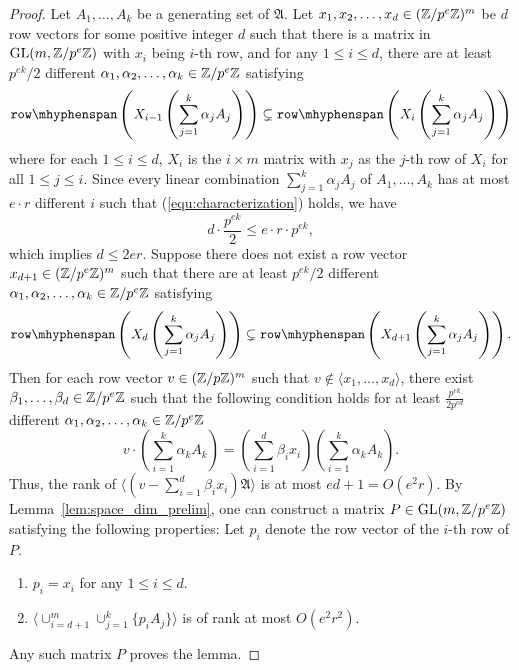 \begin{proof}
Let $A_1, \dots, A_k$ be a generating set of $\mathfrak{A}$.
Let $x_1, x_2, \dots, x_d \in (\mathbb{Z} / p^e \mathbb{Z} )^m$ be $d$ row vectors for some positive integer $d$ 
 such that there is a matrix in $\mathrm{GL}(m, \mathbb{Z} / p^e \mathbb{Z})$ with $x_i$ being $i$-th row, %
 and for any $1 \leq i \leq d$, there are at least $p^{ek} / 2$ different $\alpha_1, \alpha_2, \dots, \alpha_k \in \mathbb{Z} / p^e \mathbb{Z}$ satisfying
\begin{equation}\label{equ:characterization}\rowspan\left(X_{i-1} \left(\sum_{j =1}^k \alpha_j A_j\right)\right) \subsetneq \rowspan\left(X_i \left(\sum_{j =1}^k \alpha_j A_j\right)\right)\end{equation} where for each $1 \leq i \leq d$,
$X_i$ is the $i \times m$ matrix with $x_j$ as the $j$-th row of $X_i$ for all $1 \leq j \leq i$.
Since every linear combination $\sum_{j =1}^k \alpha_j A_j$ of $A_1, \dots, A_k$ has at most $e \cdot r$ different $i$ such that (\ref{equ:characterization}) holds, 
we have 
\[d \cdot \frac{p^{ek}}{2} \leq e \cdot r \cdot p^{ek},\]
which implies $d \leq 2er$. Suppose there does not exist a row vector $x_{d+1} \in (\mathbb{Z} / p^e \mathbb{Z})^m$ such that there are at least $p^{ek} / 2$ different $\alpha_1, \alpha_2, \dots, \alpha_k\in\mathbb{Z} / p^e \mathbb{Z}$ satisfying
\[\rowspan\left(X_{d} \left(\sum_{j =1}^k \alpha_j A_j\right)\right) \subsetneq \rowspan\left(X_{d+1} \left(\sum_{j =1}^k \alpha_j A_j\right)\right).\]
Then for each row vector $v \in (\mathbb{Z} / p\mathbb{Z})^m$ such that $v\notin \langle x_1, \dots, x_d\rangle$, 
there exist $\beta_1, \dots, \beta_d \in \mathbb{Z} / p^e\mathbb{Z}$ such that the following condition holds for at least $\frac{p^{ek}}{ 2p^{ed}}$ different $\alpha_1, \alpha_2, \dots, \alpha_k \in \mathbb{Z} / p^e\mathbb{Z}$
\[v \cdot \left(\sum_{i = 1}^k \alpha_k A_k\right) = \left(\sum_{i=1}^d \beta_i x_i\right)\left(\sum_{i = 1}^k \alpha_k A_k\right).\]
Thus, the rank of $\langle (v -  \sum_{i=1}^d \beta_i x_i) \mathfrak{A}\rangle$ is at most $ed + 1 = O(e^2r)$. 
By Lemma~\ref{lem:space_dim_prelim}, one can construct a matrix $P \in \mathrm{GL}(m, \mathbb{Z} / p^e \mathbb{Z})$ satisfying the following properties: Let $p_i$ denote the row vector of the $i$-th row of $P$.
\begin{enumerate}
\item $p_i = x_i$  for any $1 \leq i \leq d$.
\item $\langle \cup_{i = d + 1}^m \cup_{j = 1}^k\{ p_i A_j \}\rangle$ is of rank at most $O(e^2r^2)$. 
\end{enumerate} 
Any such matrix $P$ proves the lemma.
\end{proof}

